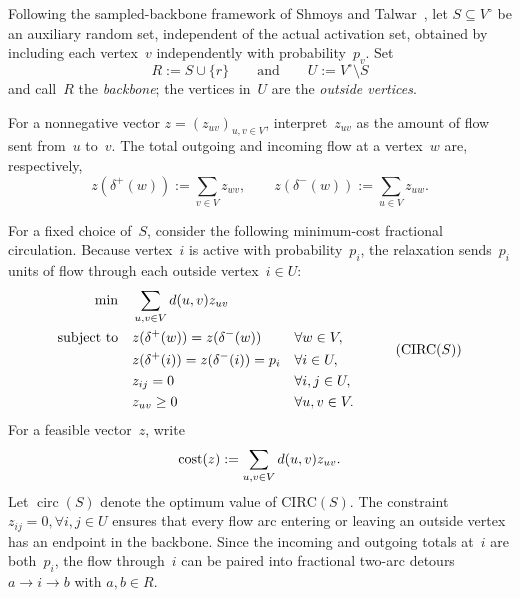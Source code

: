\documentclass[12pt,a4paper,oneside]{report}
\begin{document}
Following the sampled-backbone framework of Shmoys and
Talwar~\cite{Shmoys2008}, let $S\subseteq V^\circ$ be an auxiliary random
set, independent of the actual activation set, obtained by including each
vertex~$v$ independently with probability~$p_v$.  Set
\[
    R:=S\cup\{r\}
    \qquad\text{and}\qquad
    U:=V^\circ\setminus S
\]
and call~$R$ the \emph{backbone}; the vertices in~$U$ are the \emph{outside
vertices}.

For a nonnegative vector $z=(z_{uv})_{u,v\in V}$, interpret~$z_{uv}$ as the
amount of flow sent from~$u$ to~$v$.  The total outgoing and incoming flow at
a vertex~$w$ are, respectively,
\[
    z(\delta^+(w)):=\sum_{v\in V} z_{wv},
    \qquad
    z(\delta^-(w)):=\sum_{u\in V} z_{uw}.
\]

For a fixed choice of~$S$, consider the following minimum-cost fractional
circulation.  Because vertex~$i$ is active with probability~$p_i$, the
relaxation sends~$p_i$ units of flow through each outside vertex~$i\in U$:
\begin{equation*}
\begin{aligned}
\min\quad
    &\sum_{u,v\in V}d(u,v)z_{uv}\\
\text{subject to}\quad
    &z(\delta^+(w))=z(\delta^-(w))
        &&\forall w\in V,\\
    &z(\delta^+(i))=z(\delta^-(i))=p_i
        &&\forall i\in U,\\
    &z_{ij}=0
        &&\forall i,j\in U,\\
    &z_{uv}\ge0
        &&\forall u,v\in V.
\end{aligned}
\tag{$\mathrm{CIRC}(S)$}\label{eq:backbone-circulation-lp}
\end{equation*}
For a feasible vector~$z$, write
\[
    \operatorname{cost}(z):=\sum_{u,v\in V}d(u,v)z_{uv}.
\]
Let $\operatorname{circ}(S)$ denote the optimum value of
$\mathrm{CIRC}(S)$.
The constraint $z_{ij}=0, \forall i,j\in U$ ensures that every flow arc entering or
leaving an outside vertex has an endpoint in the backbone.  Since the
incoming and outgoing totals at~$i$ are both~$p_i$, the flow through~$i$ can
be paired into fractional two-arc detours $a\to i\to b$ with $a,b\in R$.
\end{document}
